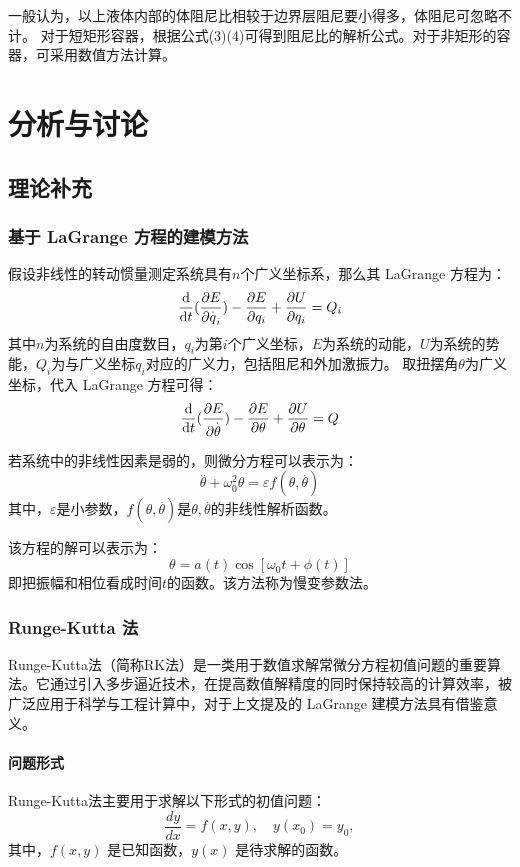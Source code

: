 \documentclass[12pt,hyperref,a4paper,UTF8]{ctexart}
\begin{document}
        一般认为，以上液体内部的体阻尼比相较于边界层阻尼要小得多，体阻尼可忽略不计。  
        对于短矩形容器，根据公式(3)(4)可得到阻尼比的解析公式。对于非矩形的容器，可采用数值方法计算。

\section{分析与讨论}

\subsection{理论补充}
\subsubsection{基于 LaGrange 方程的建模方法}
假设非线性的转动惯量测定系统具有$n$个广义坐标系，那么其 LaGrange 方程为：
$$ \frac{\text d}{\text dt}(\frac{\partial E}{\partial\overset{.}q_i})-\frac{\partial E}{\partial q_i}+\frac{\partial U}{\partial q_i}=Q_i $$
其中$n$为系统的自由度数目，$q_i$为第$i$个广义坐标，$E$为系统的动能，$U$为系统的势能，$Q_i$为与广义坐标$q_i$对应的广义力，包括阻尼和外加激振力。
取扭摆角$\theta$为广义坐标，代入 LaGrange 方程可得：
$$ \frac{\text d}{\text dt}(\frac{\partial E}{\partial\overset{.}\theta})-\frac{\partial E}{\partial \theta}+\frac{\partial U}{\partial \theta}=Q $$

若系统中的非线性因素是弱的，则微分方程可以表示为：
$$ \overset{..}\theta+\omega_0^2\theta=\varepsilon f(\theta,\overset{.}\theta) $$
其中，$\varepsilon$是小参数，$f(\theta,\overset{.}\theta)$是$\theta,\overset{.}\theta$的非线性解析函数。

该方程的解可以表示为：
$$ \theta=a(t)\cos[\omega_0t+\phi(t)] $$
即把振幅和相位看成时间$t$的函数。该方法称为慢变参数法。
\subsubsection{Runge-Kutta 法}

Runge-Kutta法（简称RK法）是一类用于数值求解常微分方程初值问题的重要算法。它通过引入多步逼近技术，在提高数值解精度的同时保持较高的计算效率，被广泛应用于科学与工程计算中，对于上文提及的 LaGrange 建模方法具有借鉴意义。

\paragraph{问题形式}
Runge-Kutta法主要用于求解以下形式的初值问题：
\[
\frac{dy}{dx} = f(x, y), \quad y(x_0) = y_0,
\]
其中，\( f(x, y) \) 是已知函数，\( y(x) \) 是待求解的函数。
\end{document}
